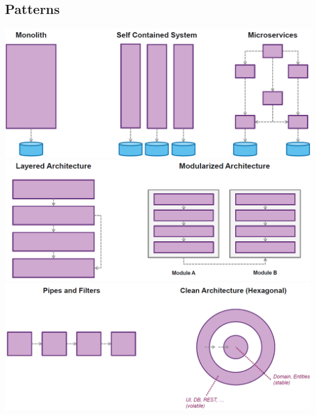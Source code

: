 \subsection{Patterns}
\includegraphics[width=\linewidth]{../img/architecture_patterns_1.png}
\includegraphics[width=\linewidth]{../img/architecture_patterns_2.png}
\includegraphics[width=\linewidth]{../img/architecture_patterns_3.png}











